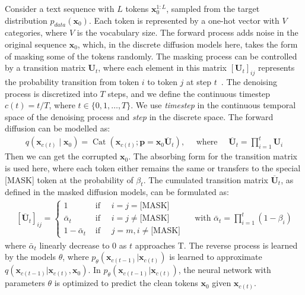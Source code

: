 \documentclass{article}
\begin{document}
Consider a text sequence with $L$ tokens $\mathbf{x}^{1:L}_0$, sampled from the target distribution $p_{data}(\mathbf{x}_0)$. Each token is represented by a one-hot vector with $V$ categories, where $V$ is the vocabulary size. 
The forward process adds noise in the original sequence $\mathbf{x}_0$, which, in the discrete diffusion models here, takes the form of masking some of the tokens randomly. 
The masking process can be controlled by a transition matrix $\boldsymbol{U}_t$, where each element in this matrix $\left[\boldsymbol{U}_t\right]_{ij}$ represents the probability transition from token $i$ to token $j$ at step $t$~\cite{austin2021structured}. The denoising process is discretized into $T$ steps, and we define the continuous timestep $c(t) = t / T$, where $t \in \{0, 1, \ldots, T\}$. We use \emph{timestep} in the continuous temporal space of the denoising process and \emph{step} in the discrete space. The forward diffusion can be modelled as:
\begin{align*}
    q\left(\boldsymbol{x}_{c(t)} \mid \boldsymbol{x}_0\right)=\operatorname{Cat}\left(\boldsymbol{x}_{c(t)} ; \boldsymbol{p}=\boldsymbol{x}_0 \overline{\boldsymbol{U}}_{t}\right), \quad \text { where } \quad \overline{\boldsymbol{U}}_{t}=\prod_{i=1}^t\boldsymbol{U}_i
\end{align*}
Then we can get the corrupted $\mathbf{x}_0$. The absorbing form for the transition matrix is used here, where each token either remains the same or transfers to the special [MASK] token at the probability of $\beta_t$. The cumulated transition matrix $\overline{\boldsymbol{U}}_t$, as defined in the masked diffusion models, can be formulated as:
\begin{align*}
    \left[\overline{\boldsymbol{U}}_t\right]_{ij}=\left\{\begin{array}{lll}
1 & \text { if } \quad i = j = \text{[MASK]} \\
\bar{\alpha}_t & \text { if } \quad i=j \neq \text{[MASK]} \\
1 - \bar\alpha_t & \text { if } \quad j=m, i \neq \text{[MASK]} 
\end{array}\right. \quad \text { with } \bar\alpha_t = \prod_{i=1}^t\left(1 -\beta_i\right)
\end{align*}
where $\bar\alpha_t$ linearly decrease to 0 as $t$ approaches T.
The reverse process is learned by the models $\theta$, where $p_{\theta}(\mathbf{x}_{c(t-1)}|\mathbf{x}_{c(t)})$ is learned to approximate $q(\mathbf{x}_{c(t-1)}|\mathbf{x}_{c(t)}, \mathbf{x}_0)$. In $p_{\theta}(\mathbf{x}_{c(t-1)}|\mathbf{x}_{c(t)})$, the neural network with parameters $\theta$ is optimized to predict the clean tokens $\mathbf{x}_0$ given $\mathbf{x}_{c(t)}$. 
\end{document}
